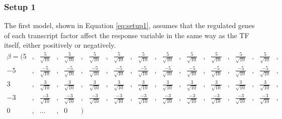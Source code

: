 \subsubsection{Setup 1}
The first model, shown in Equation \ref{eq:setup1}, assumes that the regulated genes of each transcript factor affect the response variable in the same way as the TF itself, either positively or negatively.
\begin{equation} \label{eq:setup1} 
\begin{aligned}
\beta = (	5&,& \frac{5}{\sqrt{10}}&,&  \frac{5}{\sqrt{10}}&,&  \frac{5}{\sqrt{10}}&,&  \frac{5}{\sqrt{10}}&,&  \frac{5}{\sqrt{10}}&,&  \frac{5}{\sqrt{10}}&,&  \frac{5}{\sqrt{10}}&,&  \frac{5}{\sqrt{10}}&,&  \frac{5}{\sqrt{10}}&,&  \frac{5}{\sqrt{10}}&,& \\
-5&,& \frac{-5}{\sqrt{10}}&,&  \frac{-5}{\sqrt{10}}&,&  \frac{-5}{\sqrt{10}}&,&  \frac{-5}{\sqrt{10}}&,&  \frac{-5}{\sqrt{10}}&,&  \frac{-5}{\sqrt{10}}&,&  \frac{-5}{\sqrt{10}}&,&  \frac{-5}{\sqrt{10}}&,&  \frac{-5}{\sqrt{10}}&,&  \frac{-5}{\sqrt{10}}&,& \\
3&,& \frac{3}{\sqrt{10}}&,&  \frac{3}{\sqrt{10}}&,&  \frac{3}{\sqrt{10}}&,&  \frac{3}{\sqrt{10}}&,&  \frac{3}{\sqrt{10}}&,&  \frac{3}{\sqrt{10}}&,&  \frac{3}{\sqrt{10}}&,&  \frac{3}{\sqrt{10}}&,&  \frac{3}{\sqrt{10}}&,&  \frac{3}{\sqrt{10}}&,& \\
-3&,& \frac{-3}{\sqrt{10}}&,&  \frac{-3}{\sqrt{10}}&,&  \frac{-3}{\sqrt{10}}&,&  \frac{-3}{\sqrt{10}}&,&  \frac{-3}{\sqrt{10}}&,&  \frac{-3}{\sqrt{10}}&,&  \frac{-3}{\sqrt{10}}&,&  \frac{-3}{\sqrt{10}}&,&  \frac{-3}{\sqrt{10}}&,&  \frac{-3}{\sqrt{10}}&,& \\
0&,& ...&,& 0&)&
\end{aligned}
\end{equation}

